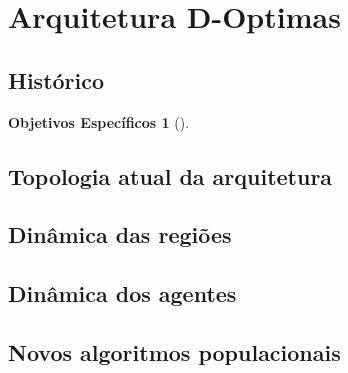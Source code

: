 \section{Arquitetura D-Optimas}
\subsection{Histórico}
\begin{frame}\justifying
	\newtheorem{mur2}{Objetivos Específicos}
	\begin{mur2}[]
		\justifying
		
	\end{mur2}
\end{frame}

\subsection{Topologia atual da arquitetura}
\begin{frame}\justifying
	\begin{itemize}
	
	\end{itemize}
\end{frame}

\subsection{Dinâmica das regiões}
\begin{frame}\justifying
    \begin{itemize}
    \end{itemize}
\end{frame}

\subsection{Dinâmica dos agentes}
\begin{frame} \justifying
    \begin{itemize}
    \end{itemize}
\end{frame}

\subsection{Novos algoritmos populacionais}
\begin{frame}\justifying
\end{frame}
